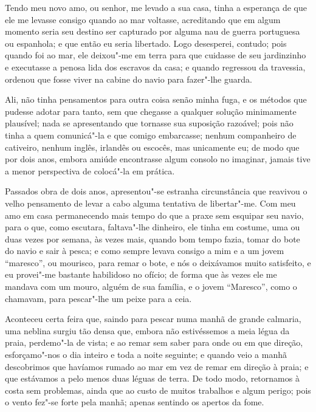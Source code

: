 Tendo meu novo amo, ou senhor, me levado a sua casa, tinha a esperança
de que ele me levasse consigo quando ao mar voltasse, acreditando que em
algum momento seria seu destino ser capturado por alguma nau de guerra
portuguesa ou espanhola; e que então eu seria libertado. Logo
desesperei, contudo; pois quando foi ao mar, ele deixou"-me em terra para
que cuidasse de seu jardinzinho e executasse a penosa lida dos escravos
da casa; e quando regressou da travessia, ordenou que fosse viver na
cabine do navio para fazer"-lhe guarda.

Ali, não tinha pensamentos para outra coisa senão minha fuga, e os
métodos que pudesse adotar para tanto, sem que chegasse a qualquer
solução minimamente plausível; nada se apresentando que tornasse sua
suposição razoável; pois não tinha a quem comunicá"-la e que comigo
embarcasse; nenhum companheiro de cativeiro, nenhum inglês, irlandês ou
escocês, mas unicamente eu; de modo que por dois anos, embora amiúde
encontrasse algum consolo no imaginar, jamais tive a menor perspectiva
de colocá"-la em prática.

Passados obra de dois anos, apresentou"-se estranha circunstância que
reavivou o velho pensamento de levar a cabo alguma tentativa de
libertar"-me. Com meu amo em casa permanecendo mais tempo do que a praxe
sem esquipar seu navio, para o que, como escutara, faltava"-lhe dinheiro,
ele tinha em costume, uma ou duas vezes por semana, às vezes mais,
quando bom tempo fazia, tomar do bote do navio e sair à pesca; e como
sempre levava consigo a mim e a um jovem ``maresco'', ou mourisco, para
remar o bote, e nós o deixávamos muito satisfeito, e eu provei"-me
bastante habilidoso no ofício; de forma que às vezes ele me mandava com
um mouro, alguém de sua família, e o jovem ``Maresco'', como o chamavam,
para pescar"-lhe um peixe para a ceia.

Aconteceu certa feira que, saindo para pescar numa manhã de grande
calmaria, uma neblina surgiu tão densa que, embora não estivéssemos a
meia légua da praia, perdemo"-la de vista; e ao remar sem saber para onde
ou em que direção, esforçamo"-nos o dia inteiro e toda a noite seguinte;
e quando veio a manhã descobrimos que havíamos rumado ao mar em vez de
remar em direção à praia; e que estávamos a pelo menos duas léguas de
terra. De todo modo, retornamos à costa sem problemas, ainda que ao
custo de muitos trabalhos e algum perigo; pois o vento fez"-se forte pela
manhã; apenas sentindo os apertos da fome.

